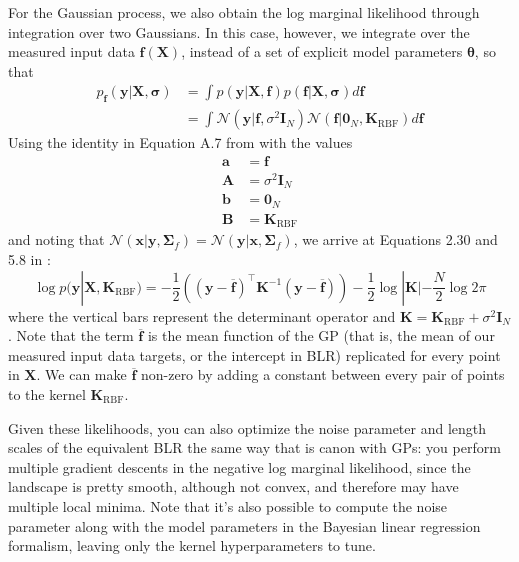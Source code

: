 \documentclass{article}
\begin{document}
For the Gaussian process, we also obtain the log marginal likelihood through integration over two Gaussians. In this case, however, we integrate over the measured input data $\mathbf{f}(\mathbf{X})$, instead of a set of explicit model parameters $\boldsymbol{\theta}$, so that
\begin{equation}
\begin{split}
    p_{\mathbf{f}}(\mathbf{y}|\mathbf{X},\boldsymbol{\sigma})&=\int p(\mathbf{y}|\mathbf{X},\mathbf{f})p(\mathbf{f}|\mathbf{X},\boldsymbol{\sigma})d\mathbf{f} \\
    &= \int \mathcal{N}(\mathbf{y}|\mathbf{f},\sigma^2\mathbf{I}_N)\mathcal{N}(\mathbf{f}|\mathbf{0}_{N},\mathbf{K}_\text{RBF})d\mathbf{f}
    \end{split}
\end{equation}Using the identity in Equation A.7 from \cite{rasmussen} with the values
\begin{equation}
\begin{split}
    \mathbf{a} &= \mathbf{f} \\
    \mathbf{A} &= \sigma^2\mathbf{I}_N \\
    \mathbf{b} &= \mathbf{0}_N \\
    \mathbf{B} &= \mathbf{K}_\text{RBF}
\end{split}
\end{equation}and noting that $\mathcal{N}(\mathbf{x}|\mathbf{y},\boldsymbol{\Sigma}_f)=\mathcal{N}(\mathbf{y}|\mathbf{x},\boldsymbol{\Sigma}_f)$, we arrive at Equations 2.30 and 5.8 in \cite{rasmussen}:
\begin{equation}
    \log p(\mathbf{y}|\mathbf{X},\mathbf{K}_\text{RBF}) = -\frac{1}{2}\left((\mathbf{y}-\overline{\mathbf{f}})^\top \mathbf{K}^{-1} (\mathbf{y}-\overline{\mathbf{f}}) \right) - \frac{1}{2}\log|\mathbf{K}| - \frac{N}{2}\log 2\pi
\end{equation}where the vertical bars represent the determinant operator and $\mathbf{K}=\mathbf{K}_\text{RBF}+\sigma^2 \mathbf{I}_N$. Note that the term $\overline{\mathbf{f}}$ is the mean function of the GP (that is, the mean of our measured input data targets, or the intercept in BLR) replicated for every point in $\mathbf{X}$. We can make $\overline{\mathbf{f}}$ non-zero by adding a constant between every pair of points to the kernel $\mathbf{K}_\text{RBF}$.

Given these likelihoods, you can also optimize the noise parameter and length scales of the equivalent BLR the same way that is canon with GPs: you perform multiple gradient descents in the negative log marginal likelihood, since the landscape is pretty smooth, although not convex, and therefore may have multiple local minima. Note that it's also possible to compute the noise parameter along with the model parameters in the Bayesian linear regression formalism\cite{KoyoteScience}, leaving only the kernel hyperparameters to tune.
\end{document}
